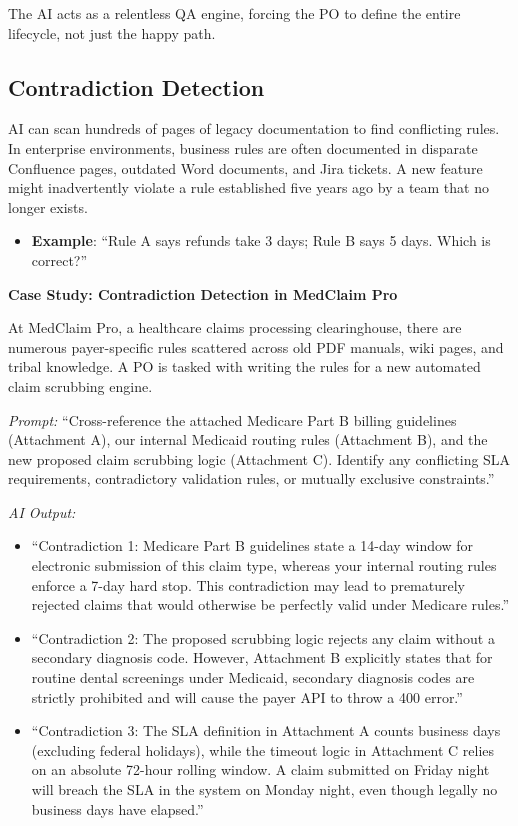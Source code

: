 \documentclass[
  11pt,
  openany,
  oneside]{book}
\providecommand{\tightlist}{%
  \setlength{\itemsep}{0pt}\setlength{\parskip}{0pt}}
\begin{document}
The AI acts as a relentless QA engine, forcing the PO to define the
entire lifecycle, not just the happy path.

\subsection{Contradiction Detection}\label{contradiction-detection}

AI can scan hundreds of pages of legacy documentation to find
conflicting rules. In enterprise environments, business rules are often
documented in disparate Confluence pages, outdated Word documents, and
Jira tickets. A new feature might inadvertently violate a rule
established five years ago by a team that no longer exists.

\begin{itemize}
\tightlist
\item
  \textbf{Example}: ``Rule A says refunds take 3 days; Rule B says 5
  days. Which is correct?''
\end{itemize}

\textbf{Case Study: Contradiction Detection in MedClaim Pro}

At MedClaim Pro, a healthcare claims processing clearinghouse, there are
numerous payer-specific rules scattered across old PDF manuals, wiki
pages, and tribal knowledge. A PO is tasked with writing the rules for a
new automated claim scrubbing engine.

\emph{Prompt:} ``Cross-reference the attached Medicare Part B billing
guidelines (Attachment A), our internal Medicaid routing rules
(Attachment B), and the new proposed claim scrubbing logic (Attachment
C). Identify any conflicting SLA requirements, contradictory validation
rules, or mutually exclusive constraints.''

\emph{AI Output:}

\begin{itemize}
\tightlist
\item
  ``Contradiction 1: Medicare Part B guidelines state a 14-day window
  for electronic submission of this claim type, whereas your internal
  routing rules enforce a 7-day hard stop. This contradiction may lead
  to prematurely rejected claims that would otherwise be perfectly valid
  under Medicare rules.''
\item
  ``Contradiction 2: The proposed scrubbing logic rejects any claim
  without a secondary diagnosis code. However, Attachment B explicitly
  states that for routine dental screenings under Medicaid, secondary
  diagnosis codes are strictly prohibited and will cause the payer API
  to throw a 400 error.''
\item
  ``Contradiction 3: The SLA definition in Attachment A counts business
  days (excluding federal holidays), while the timeout logic in
  Attachment C relies on an absolute 72-hour rolling window. A claim
  submitted on Friday night will breach the SLA in the system on Monday
  night, even though legally no business days have elapsed.''
\end{itemize}
\end{document}
